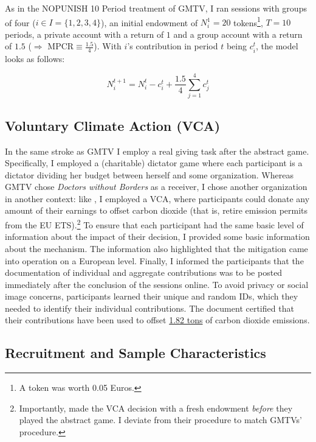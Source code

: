 \documentclass[
  authoryear,
  review,
  3p,
  onecolumn]{elsarticle}
\begin{document}
As in the NOPUNISH 10 Period treatment of GMTV, I ran sessions with
groups of four (\(i \in I=\{1,2,3,4\}\)), an initial endowment of
\(N_i^1 = 20\) tokens\footnote{A token was worth 0.05 Euros.}, \(T=10\)
periods, a private account with a return of \(1\) and a group account
with a return of \(1.5\) (\(\Rightarrow\) MPCR\(\equiv \frac{1.5}{4}\)).
With \(i\)'s contribution in period \(t\) being \(c_i^t\), the model
looks as follows:

\[
N_i^{t+1}=N_i^t - c_i^t + \frac{1.5}{4}\sum_{j=1}^4 c_j^t
\]

\hypertarget{voluntary-climate-action-vca}{%
\subsection{Voluntary Climate Action
(VCA)}\label{voluntary-climate-action-vca}}

In the same stroke as GMTV I employ a real giving task after the
abstract game. Specifically, I employed a (charitable) dictator game
where each participant is a dictator dividing her budget between herself
and some organization. Whereas GMTV chose \emph{Doctors without Borders}
as a receiver, I chose another organization in another context: like
\citet{GKLS2020}, I employed a VCA, where participants could donate any
amount of their earnings to offset carbon dioxide (that is, retire
emission permits from the EU ETS).\footnote{Importantly,
  \citet{GKLS2020} made the VCA decision with a fresh endowment
  \emph{before} they played the abstract game. I deviate from their
  procedure to match GMTVs' procedure.} To ensure that each participant
had the same basic level of information about the impact of their
decision, I provided some basic information about the mechanism. The
information also highlighted that the mitigation came into operation on
a European level. Finally, I informed the participants that the
documentation of individual and aggregate contributions was to be posted
immediately after the conclusion of the sessions online. To avoid
privacy or social image concerns, participants learned their unique and
random IDs, which they needed to identify their individual
contributions. The document certified that their contributions have been
used to offset
\href{https://www.compensators.org/compensatelist/?searchterm=stefan+traub}{1.82
tons} of carbon dioxide emissions.

\hypertarget{sec-sample}{%
\subsection{Recruitment and Sample Characteristics}\label{sec-sample}}
\end{document}

